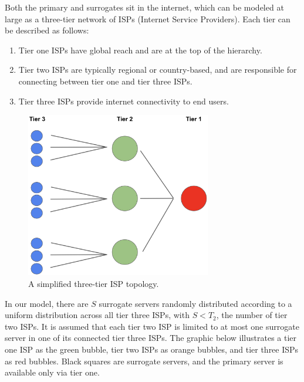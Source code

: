 \documentclass[
	a4paper, %
	10pt, %
	unnumberedsections, %
	twoside, %
]{LTJournalArticle}
\begin{document}
Both the primary and surrogates sit in the internet, which can be modeled at large as a three-tier network of ISPs (Internet Service Providers). Each tier can be described as follows:
\begin{enumerate}
    \item Tier one ISPs have global reach and are at the top of the hierarchy.
    \item Tier two ISPs are typically regional or country-based, and are responsible for connecting between tier one and tier three ISPs.
    \item Tier three ISPs provide internet connectivity to end users.
\end{enumerate}

\begin{figure}[h]
	\begin{center}
		\includegraphics[width=8.1cm]{tier-2.png}
	\end{center}
	\caption{A simplified three-tier ISP topology.}	
\end{figure}

In our model, there are $S$ surrogate servers randomly distributed according to a uniform distribution across all tier three ISPs, with $S < T_2$, the number of tier two ISPs. It is assumed that each tier two ISP is limited to at most one surrogate server in one of its connected tier three ISPs. The graphic below illustrates a tier one ISP as the green bubble, tier two ISPs as orange bubbles, and tier three ISPs as red bubbles. Black squares are surrogate servers, and the primary server is available only via tier one.
\end{document}
